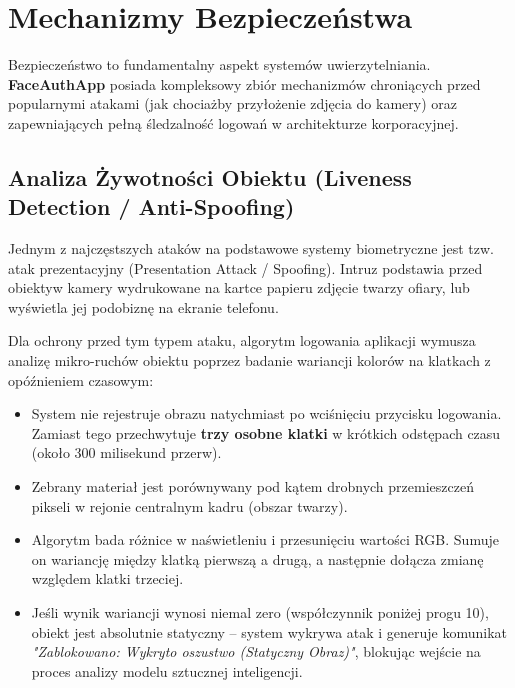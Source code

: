 \chapter{Mechanizmy Bezpieczeństwa}

Bezpieczeństwo to fundamentalny aspekt systemów uwierzytelniania. \textbf{FaceAuthApp} posiada kompleksowy zbiór mechanizmów chroniących przed popularnymi atakami (jak chociażby przyłożenie zdjęcia do kamery) oraz zapewniających pełną śledzalność logowań w architekturze korporacyjnej.

\section{Analiza Żywotności Obiektu (Liveness Detection / Anti-Spoofing)}
Jednym z najczęstszych ataków na podstawowe systemy biometryczne jest tzw. atak prezentacyjny (Presentation Attack / Spoofing). Intruz podstawia przed obiektyw kamery wydrukowane na kartce papieru zdjęcie twarzy ofiary, lub wyświetla jej podobiznę na ekranie telefonu.

Dla ochrony przed tym typem ataku, algorytm logowania aplikacji wymusza analizę mikro-ruchów obiektu poprzez badanie wariancji kolorów na klatkach z opóźnieniem czasowym:
\begin{itemize}
    \item System nie rejestruje obrazu natychmiast po wciśnięciu przycisku logowania. Zamiast tego przechwytuje \textbf{trzy osobne klatki} w krótkich odstępach czasu (około 300 milisekund przerw).
    \item Zebrany materiał jest porównywany pod kątem drobnych przemieszczeń pikseli w rejonie centralnym kadru (obszar twarzy).
    \item Algorytm bada różnice w naświetleniu i przesunięciu wartości RGB. Sumuje on wariancję między klatką pierwszą a drugą, a następnie dołącza zmianę względem klatki trzeciej.
    \item Jeśli wynik wariancji wynosi niemal zero (współczynnik poniżej progu 10), obiekt jest absolutnie statyczny – system wykrywa atak i generuje komunikat \textit{"Zablokowano: Wykryto oszustwo (Statyczny Obraz)"}, blokując wejście na proces analizy modelu sztucznej inteligencji.
\end{itemize}

